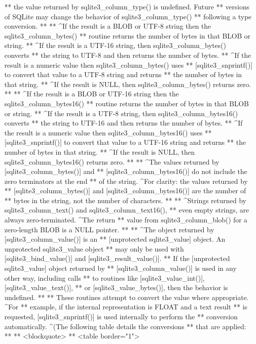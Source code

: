 \begin{Codex}[label=sqlite3.h,numbers=left]
{** the value returned by sqlite3_column_type() is undefined.  Future
** versions of SQLite may change the behavior of sqlite3_column_type()
** following a type conversion.
**
** ^If the result is a BLOB or UTF-8 string then the sqlite3_column_bytes()
** routine returns the number of bytes in that BLOB or string.
** ^If the result is a UTF-16 string, then sqlite3_column_bytes() converts
** the string to UTF-8 and then returns the number of bytes.
** ^If the result is a numeric value then sqlite3_column_bytes() uses
** [sqlite3_snprintf()] to convert that value to a UTF-8 string and returns
** the number of bytes in that string.
** ^If the result is NULL, then sqlite3_column_bytes() returns zero.
**
** ^If the result is a BLOB or UTF-16 string then the sqlite3_column_bytes16()
** routine returns the number of bytes in that BLOB or string.
** ^If the result is a UTF-8 string, then sqlite3_column_bytes16() converts
** the string to UTF-16 and then returns the number of bytes.
** ^If the result is a numeric value then sqlite3_column_bytes16() uses
** [sqlite3_snprintf()] to convert that value to a UTF-16 string and returns
** the number of bytes in that string.
** ^If the result is NULL, then sqlite3_column_bytes16() returns zero.
**
** ^The values returned by [sqlite3_column_bytes()] and 
** [sqlite3_column_bytes16()] do not include the zero terminators at the end
** of the string.  ^For clarity: the values returned by
** [sqlite3_column_bytes()] and [sqlite3_column_bytes16()] are the number of
** bytes in the string, not the number of characters.
**
** ^Strings returned by sqlite3_column_text() and sqlite3_column_text16(),
** even empty strings, are always zero-terminated.  ^The return
** value from sqlite3_column_blob() for a zero-length BLOB is a NULL pointer.
**
** ^The object returned by [sqlite3_column_value()] is an
** [unprotected sqlite3_value] object.  An unprotected sqlite3_value object
** may only be used with [sqlite3_bind_value()] and [sqlite3_result_value()].
** If the [unprotected sqlite3_value] object returned by
** [sqlite3_column_value()] is used in any other way, including calls
** to routines like [sqlite3_value_int()], [sqlite3_value_text()],
** or [sqlite3_value_bytes()], then the behavior is undefined.
**
** These routines attempt to convert the value where appropriate.  ^For
** example, if the internal representation is FLOAT and a text result
** is requested, [sqlite3_snprintf()] is used internally to perform the
** conversion automatically.  ^(The following table details the conversions
** that are applied:
**
** <blockquote>
** <table border="1">
}
\end{Codex}
